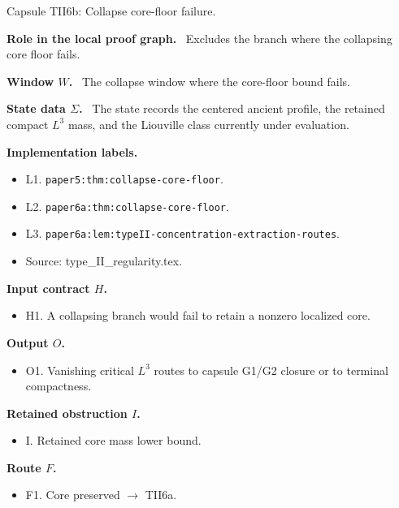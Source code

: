 \documentclass[11pt]{amsart}
\newcommand{\capsulefield}[1]{\par\smallskip\noindent\textbf{#1.}\ }
\begin{document}
\begin{proofcapsule}{Capsule TII6b: Collapse core-floor failure.}
  \capsulefield{Role in the local proof graph}
  Excludes the branch where the collapsing core floor fails.

  \capsulefield{Window \(W\)}
The collapse window where the core-floor bound fails.

  \capsulefield{State data \(\Sigma\)}
The state records the centered ancient profile, the retained compact $L^3$ mass, and the Liouville class currently under evaluation.

  \capsulefield{Implementation labels}
  \begin{itemize}[leftmargin=1.8em]
  \item L1. \texttt{paper5:thm:collapse-core-floor}.
  \item L2. \texttt{paper6a:thm:collapse-core-floor}.
  \item L3. \texttt{paper6a:lem:typeII-concentration-extraction-routes}.
  \item Source: type\_II\_regularity.tex.
  \end{itemize}

  \capsulefield{Input contract \(H\)}
  \begin{itemize}[leftmargin=1.8em]
  \item H1. A collapsing branch would fail to retain a nonzero localized core.
  \end{itemize}

  \capsulefield{Output \(O\)}
  \begin{itemize}[leftmargin=1.8em]
  \item O1. Vanishing critical $L^3$ routes to capsule G1/G2 closure or to terminal compactness.
  \end{itemize}

  \capsulefield{Retained obstruction \(I\)}
  \begin{itemize}[leftmargin=1.8em]
  \item I. Retained core mass lower bound.
  \end{itemize}

  \capsulefield{Route \(F\)}
  \begin{itemize}[leftmargin=1.8em]
  \item F1. Core preserved $\to$ TII6a.
  \end{itemize}


\end{proofcapsule}
\end{document}
